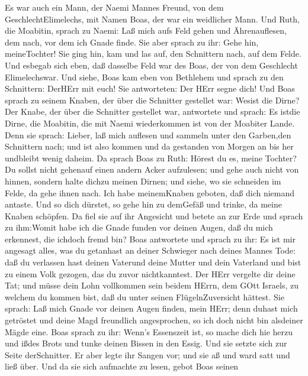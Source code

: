  Es war auch ein Mann, der Naemi Mannes Freund, von dem
GeschlechtElimelechs, mit Namen Boas, der war ein weidlicher Mann.
 Und Ruth, die Moabitin, sprach zu Naemi: Laß mich aufs Feld
gehen und Ährenauflesen, dem nach, vor dem ich Gnade finde. Sie aber
sprach zu ihr: Gehe hin, meineTochter!  Sie ging hin, kam
und las auf, den Schnittern nach, auf dem Felde. Und esbegab sich eben,
daß dasselbe Feld war des Boas, der von dem Geschlecht Elimelechswar.
 Und siehe, Boas kam eben von Bethlehem und sprach zu den
Schnittern: DerHErr mit euch! Sie antworteten: Der HErr segne dich!
 Und Boas sprach zu seinem Knaben, der über die Schnitter
gestellet war: Wesist die Dirne?  Der Knabe, der über die
Schnitter gestellet war, antwortete und sprach: Es istdie Dirne, die
Moabitin, die mit Naemi wiederkommen ist von der Moabiter Lande.
 Denn sie sprach: Lieber, laß mich auflesen und sammeln
unter den Garben,den Schnittern nach; und ist also kommen und da
gestanden von Morgen an bis her undbleibt wenig daheim.  Da
sprach Boas zu Ruth: Hörest du es, meine Tochter? Du sollst nicht
gehenauf einen andern Acker aufzulesen; und gehe auch nicht von hinnen,
sondern halte dichzu meinen Dirnen;  und siehe, wo sie
schneiden im Felde, da gehe ihnen nach. Ich habe meinemKnaben geboten,
daß dich niemand antaste. Und so dich dürstet, so gehe hin zu demGefäß
und trinke, da meine Knaben schöpfen.  Da fiel sie auf ihr
Angesicht und betete an zur Erde und sprach zu ihm:Womit habe ich die
Gnade funden vor deinen Augen, daß du mich erkennest, die ichdoch fremd
bin?  Boas antwortete und sprach zu ihr: Es ist mir
angesagt alles, was du getanhast an deiner Schwieger nach deines Mannes
Tode: daß du verlassen hast deinen Vaterund deine Mutter und dein
Vaterland und bist zu einem Volk gezogen, das du zuvor nichtkanntest.
 Der HErr vergelte dir deine Tat; und müsse dein Lohn
vollkommen sein beidem HErrn, dem GOtt Israels, zu welchem du kommen
bist, daß du unter seinen FlügelnZuversicht hättest.  Sie
sprach: Laß mich Gnade vor deinen Augen finden, mein HErr; denn duhast
mich getröstet und deine Magd freundlich angesprochen, so ich doch nicht
bin alsdeiner Mägde eine.  Boas sprach zu ihr: Wenn's
Essenszeit ist, so mache dich hie herzu und ißdes Brots und tunke deinen
Bissen in den Essig. Und sie setzte sich zur Seite derSchnitter. Er aber
legte ihr Sangen vor; und sie aß und ward satt und ließ über.
 Und da sie sich aufmachte zu lesen, gebot Boas seinen
